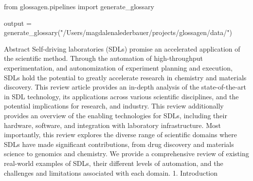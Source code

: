\documentclass{article}
\begin{document}
\begin{pycode}
from glossagen.pipelines import generate_glossary
\end{pycode}

\begin{pyblock}
output = generate_glossary("/Users/magdalenalederbauer/projects/glossagen/data/")
\end{pyblock}


Abstract
Self-driving laboratories (SDLs) promise an accelerated application of the scientific method. Through the automation of high-throughput experimentation, and autonomization of experiment planning and execution, SDLs hold the potential to greatly accelerate research in chemistry and materials discovery. This review article provides an in-depth analysis of the state-of-the-art in SDL technology, its applications across various scientific disciplines, and the potential implications for research, and industry. This review additionally provides an overview of the enabling technologies for SDLs, including their hardware, software, and integration with laboratory infrastructure. Most importantly, this review explores the diverse range of scientific domains where SDLs have made significant contributions, from drug discovery and materials science to genomics and chemistry. We provide a comprehensive review of existing real-world examples of SDLs, their different levels of automation, and the challenges and limitations associated with each domain.
1. Introduction
\end{document}
